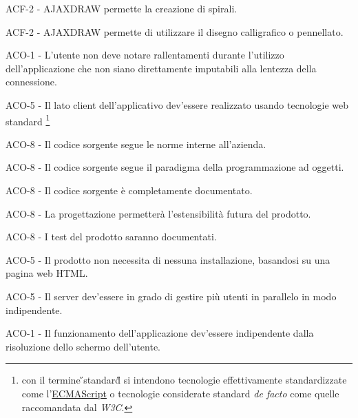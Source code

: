 \begin{elenconumerato}{\subsubsecindent}
\item{ACF-2 - AJAXDRAW permette la creazione di spirali.}
\item{ACF-2 - AJAXDRAW permette di utilizzare il disegno calligrafico o pennellato.}
\end{elenconumerato}

\begin{elenconumerato}{\subsubsecindent}
\item ACO-1 - L'utente non deve notare rallentamenti durante l'utilizzo dell'applicazione che non siano direttamente imputabili alla lentezza della connessione.
\end{elenconumerato}

\begin{elenconumerato}{\subsubsecindent}
\item ACO-5 - Il lato client dell'applicativo dev'essere realizzato usando tecnologie web standard
\footnote{con il termine \H{}standard\H{} si intendono tecnologie effettivamente standardizzate come l'\underline{ECMAScript} o tecnologie considerate standard \textit{de facto} come quelle raccomandata dal \textit{W3C}.}
\item ACO-8 - Il codice sorgente segue le norme interne all'azienda.
\item ACO-8 - Il codice sorgente segue il paradigma della programmazione ad oggetti.
\item ACO-8 - Il codice sorgente \`e completamente documentato.
\item ACO-8 - La progettazione permetter\`a l'estensibilit\`a futura del prodotto.
\item ACO-8 - I test del prodotto saranno documentati.
\item ACO-5 - Il prodotto non necessita di nessuna installazione, basandosi su una pagina web HTML.
\item ACO-5 - Il server dev'essere in grado di gestire pi\`u utenti in parallelo in modo indipendente.
\item ACO-1 - Il funzionamento dell'applicazione dev'essere indipendente dalla risoluzione dello schermo dell'utente.
\end{elenconumerato}

